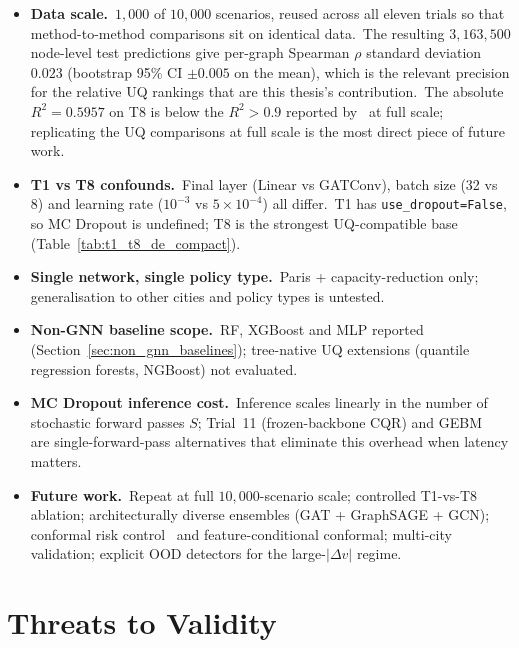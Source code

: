 \begin{itemize}
\item \textbf{Data scale.}\ $1{,}000$ of $10{,}000$ scenarios, reused across all eleven trials so that method-to-method comparisons sit on identical data.\ The resulting $3{,}163{,}500$ node-level test predictions give per-graph Spearman $\rho$ standard deviation $0.023$ (bootstrap 95\% CI $\pm 0.005$ on the mean), which is the relevant precision for the relative UQ rankings that are this thesis's contribution.\ The absolute $R^2 = 0.5957$ on T8 is below the $R^2 > 0.9$ reported by~\textcite{natterer2025ml} at full scale; replicating the UQ comparisons at full scale is the most direct piece of future work.
\item \textbf{T1 vs T8 confounds.}\label{sec:t1_vs_t8_limitation}\ Final layer (Linear vs GATConv), batch size (32 vs 8) and learning rate ($10^{-3}$ vs $5\times10^{-4}$) all differ.\ T1 has \texttt{use\_dropout=False}, so MC Dropout is undefined; T8 is the strongest UQ-compatible base (Table~\ref{tab:t1_t8_de_compact}).
\item \textbf{Single network, single policy type.}\ Paris + capacity-reduction only; generalisation to other cities and policy types is untested.
\item \textbf{Non-GNN baseline scope.}\ RF, XGBoost and MLP reported (Section~\ref{sec:non_gnn_baselines}); tree-native UQ extensions (quantile regression forests, NGBoost) not evaluated.
\item \textbf{MC Dropout inference cost.}\ Inference scales linearly in the number of stochastic forward passes $S$; Trial~11 (frozen-backbone CQR) and GEBM~\cite{fuchsgruber2024energy} are single-forward-pass alternatives that eliminate this overhead when latency matters.
\item \textbf{Future work.}\ Repeat at full $10{,}000$-scenario scale; controlled T1-vs-T8 ablation; architecturally diverse ensembles (GAT + GraphSAGE + GCN); conformal risk control~\cite{angelopoulos2023conformal} and feature-conditional conformal; multi-city validation; explicit OOD detectors for the large-$|\Delta v|$ regime.
\end{itemize}

\section{Threats to Validity}\label{sec:threats_to_validity}

